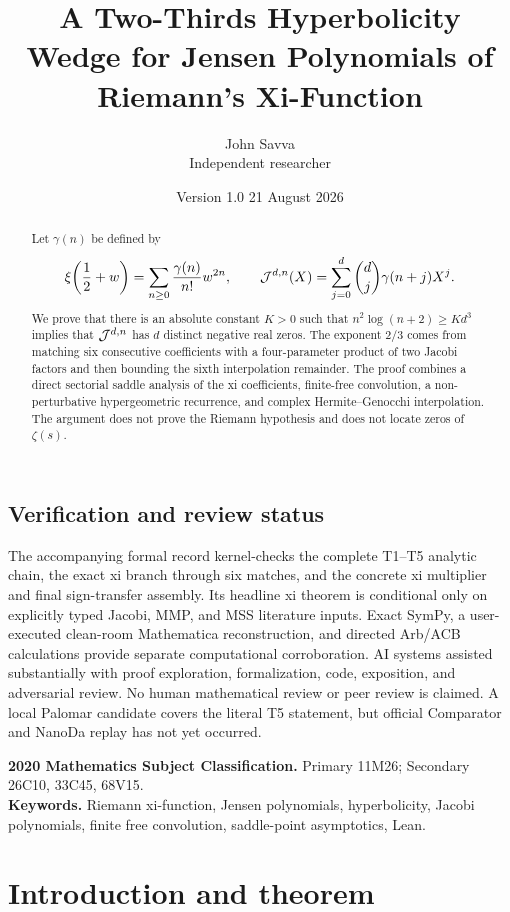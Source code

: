\documentclass[12pt]{article}
\title{A Two-Thirds Hyperbolicity Wedge for Jensen Polynomials of Riemann's Xi-Function}
\author{John Savva\\{\small Independent researcher}}
\date{Version 1.0 \textemdash{} 21 August 2026}
\begin{document}
\maketitle

\begin{abstract}
Let $\gamma(n)$ be defined by
\[
  \xi\!\left(\frac12+w\right)
  =\sum_{n\ge0}\frac{\gamma(n)}{n!}w^{2n},
\qquad
  \mathcal J^{d,n}(X)=\sum_{j=0}^{d}\binom dj\gamma(n+j)X^j.
\]
We prove that there is an absolute constant $K>0$ such that
$n^2\log(n+2)\ge Kd^3$ implies that $\mathcal J^{d,n}$ has $d$ distinct
negative real zeros.  The exponent $2/3$ comes from matching six consecutive
coefficients with a four-parameter product of two Jacobi factors and then
bounding the sixth interpolation remainder.  The proof combines a direct
sectorial saddle analysis of the xi coefficients, finite-free convolution,
a non-perturbative hypergeometric recurrence, and complex
Hermite--Genocchi interpolation.  The argument does not prove the Riemann
hypothesis and does not locate zeros of $\zeta(s)$.

\end{abstract}

\subsection*{Verification and review status}
The accompanying formal record kernel-checks the complete T1--T5 analytic
chain, the exact xi branch through six matches, and the concrete xi
multiplier and final sign-transfer assembly.  Its headline xi theorem is
conditional only on explicitly typed Jacobi, MMP, and MSS literature inputs.
Exact SymPy, a user-executed clean-room Mathematica reconstruction, and
directed Arb/ACB calculations provide separate computational corroboration.
AI systems assisted substantially with proof exploration, formalization,
code, exposition, and adversarial review.  No human mathematical review or
peer review is claimed.  A local Palomar candidate covers the literal T5
statement, but official Comparator and NanoDa replay has not yet occurred.

\noindent\textbf{2020 Mathematics Subject Classification.}
Primary 11M26; Secondary 26C10, 33C45, 68V15.\\
\textbf{Keywords.} Riemann xi-function, Jensen polynomials, hyperbolicity,
Jacobi polynomials, finite free convolution, saddle-point asymptotics, Lean.

\tableofcontents

\section{Introduction and theorem}\label{sec:introduction}
\end{document}

